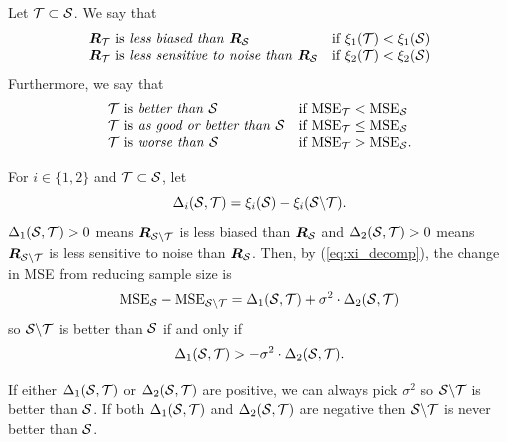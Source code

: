 \begin{defn}
Let $\mathcal{T} \subset \mathcal{S}$. We say that 
\begin{align}
    \begin{array}{l l}
        \bm{R}_{\mathcal{T}} \text{ is \emph{less biased than }} \bm{R}_{\mathcal{S}}  & \text{if } \xi_{1}(\mathcal{T}) < \xi_{1}(\mathcal{S}) \\
        \bm{R}_{\mathcal{T}} \text{ is \emph{less sensitive to noise than }} \bm{R}_{\mathcal{S}}  & \text{if } \xi_{2}(\mathcal{T}) < \xi_{2}(\mathcal{S})  
    \end{array}
\end{align}
Furthermore, we say that
\begin{align}
    \begin{array}{l l}
        \mathcal{T} \text{ is \emph{better than} }\mathcal{S} &\text{if } \textrm{MSE}_{\mathcal{T}} < \textrm{MSE}_{\mathcal{S}} \\
        \mathcal{T} \text{ is \emph{as good or better than} }\mathcal{S} &\text{if } \textrm{MSE}_{\mathcal{T}} \leq \textrm{MSE}_{\mathcal{S}} \\
        \mathcal{T} \text{ is \emph{worse than} }\mathcal{S} &\text{if } \textrm{MSE}_{\mathcal{T}} > \textrm{MSE}_{\mathcal{S}}.
    \end{array}
\end{align}
\end{defn}

\noindent For $i \in \{1,2\}$ and $\mathcal{T}\subset \mathcal{S}$, let
\begin{equation}
    \Delta_i(\mathcal{S}, \mathcal{T}) = \xi_{i}(\mathcal{S}) - \xi_{i}(\mathcal{S} \backslash \mathcal{T}). 
\end{equation}
$\Delta_{1}(\mathcal{S},\mathcal{T}) > 0$ means $\bm{R}_{\mathcal{S}\backslash \mathcal{T}}$ is less biased than $\bm{R}_{\mathcal{S}}$ and $\Delta_{2}(\mathcal{S},\mathcal{T}) > 0$ means $\bm{R}_{\mathcal{S}\backslash \mathcal{T}}$ is less sensitive to noise than $\bm{R}_{\mathcal{S}}$.
Then, by (\ref{eq:xi_decomp}), the change in MSE from reducing sample size is 
\begin{equation}
    \text{MSE}_{\mathcal{S}} - \text{MSE}_{\mathcal{S} \backslash \mathcal{T} }
    = \Delta_{1}(\mathcal{S},\mathcal{T}) + \sigma^{2} \cdot \Delta_{2}(\mathcal{S},\mathcal{T}) \label{eq:EMSE_decomp_into_delta}
\end{equation}
so $\mathcal{S} \backslash \mathcal{T}$ is better than $\mathcal{S}$ if and only if
\begin{equation}
    \Delta_{1}(\mathcal{S},\mathcal{T}) > - \sigma^{2} \cdot \Delta_{2}(\mathcal{S},\mathcal{T}). \label{eq:general:better_xi_ineq}
\end{equation}
\begin{remark}
 If either $\Delta_{1}(\mathcal{S},\mathcal{T})$ or $\Delta_{2}(\mathcal{S},\mathcal{T})$ are positive, we can always pick $\sigma^{2}$ so $\mathcal{S} \backslash \mathcal{T}$ is better than $\mathcal{S}$. If both $\Delta_{1}(\mathcal{S},\mathcal{T})$ and $\Delta_{2}(\mathcal{S},\mathcal{T})$ are negative then  $\mathcal{S} \backslash \mathcal{T}$ is never better than $\mathcal{S}$.   
\end{remark}

